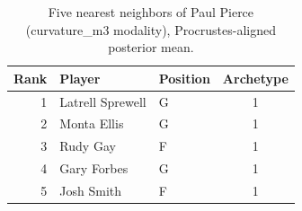 \begin{table}[htbp]
  \centering\small
  \begin{tabular}{rllc}
    \toprule
    Rank & Player & Position & Archetype \\
    \midrule
    1 & Latrell Sprewell & G & 1 \\
    2 & Monta Ellis & G & 1 \\
    3 & Rudy Gay & F & 1 \\
    4 & Gary Forbes & G & 1 \\
    5 & Josh Smith & F & 1 \\
    \bottomrule
  \end{tabular}
  \caption{Five nearest neighbors of Paul Pierce (curvature_m3 modality), Procrustes-aligned posterior mean.}
  \label{tab:Paul_Pierce_neighbors_curvature_m3}
\end{table}

